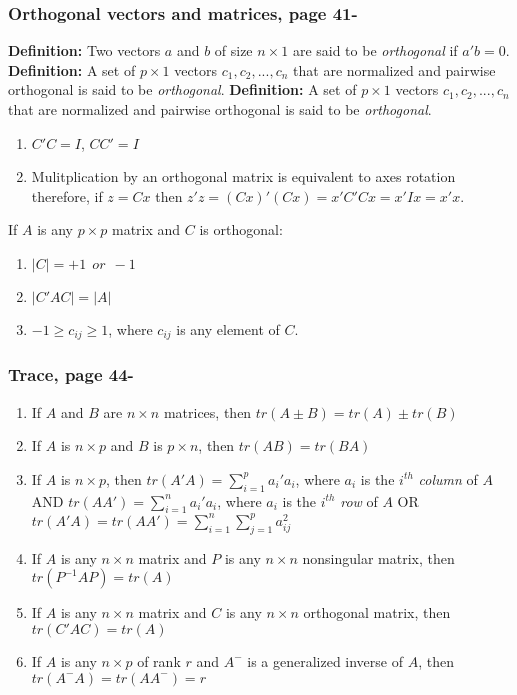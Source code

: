 \documentclass[]{article}
\begin{document}
\subsubsection{Orthogonal vectors and matrices, page 41-}
\textbf{Definition:} Two vectors $a$ and $b$ of size $n\times 1$ are said to be \emph{orthogonal} if $a'b = 0$.
\textbf{Definition:} A set of $p\times 1$ vectors $c_1,c_2,...,c_n$ that are normalized and pairwise orthogonal is said to be \emph{orthogonal}.
\textbf{Definition:} A set of $p\times 1$ vectors $c_1,c_2,...,c_n$ that are normalized and pairwise orthogonal is said to be \emph{orthogonal}.
\begin{enumerate}[1)]
	\item $C'C=I$, $CC'=I$
	\item Mulitplication by an orthogonal matrix is equivalent to axes rotation therefore, if $z=Cx$ then $z'z = (Cx)'(Cx) = x'C'Cx = x'Ix = x'x$.
\end{enumerate}
If $A$ is any $p\times p$ matrix and $C$ is orthogonal:
\begin{enumerate}[1)]
	\item $|C|=+1 ~~or~~ -1$
	\item $|C'AC| = |A|$
	\item $-1 \geq c_{ij} \geq 1$, where $c_{ij}$ is any element of $C$.
\end{enumerate}

\subsubsection{Trace, page 44-}
\begin{enumerate}[1)]
	\item If $A$ and $B$ are $n\times n$ matrices, then $tr(A \pm B) = tr(A) \pm tr(B)$
	\item If $A$ is $n\times p$ and $B$ is $p\times n$, then $tr(AB) = tr(BA)$
	\item If $A$ is $n\times p$, then $tr(A'A) = \sum_{i=1}^p a_i' a_i$, where $a_i$ is the $i^{th}$ \emph{column} of $A$ AND $tr(AA') = \sum_{i=1}^n a_i' a_i$, where $a_i$ is the $i^{th}$ \emph{row} of $A$ OR $tr(A'A) = tr(AA') = \sum_{i=1}^n\sum_{j=1}^p a_{ij}^2$
	\item If $A$ is any $n\times n$ matrix and $P$ is any $n\times n$ nonsingular matrix, then $tr(P^{-1}AP) = tr(A)$
	\item If $A$ is any $n\times n$ matrix and $C$ is any $n\times n$ orthogonal matrix, then $tr(C'AC) = tr(A)$
	\item If $A$ is any $n\times p$ of rank $r$ and $A^-$ is a generalized inverse of $A$, then $tr(A^-A) = tr(AA^-) = r$
\end{enumerate}
\end{document}
